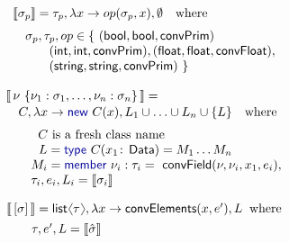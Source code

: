 \documentclass[10pt,preprint,clearpagebib]{sigplanconf}
\newcommand{\langl}{\begin{picture}(4.5,7)
\put(1.1,2.5){\rotatebox{60}{\line(1,0){5.5}}}
\put(1.1,2.5){\rotatebox{300}{\line(1,0){5.5}}}
\end{picture}}
\newcommand{\rangl}{\begin{picture}(4.5,7)
\put(.9,2.5){\rotatebox{120}{\line(1,0){5.5}}}
\put(.9,2.5){\rotatebox{240}{\line(1,0){5.5}}}
\end{picture}}
\newcommand{\kvd}[1]{\textnormal{\textcolor{kvdclr}{\sffamily #1}}}
\newcommand{\ident}[1]{\textnormal{\sffamily #1}}
\newcommand{\sem}[1]{\llbracket #1 \rrbracket}
\begin{document}
\begin{figure}
\begin{multicols}{2}

\noindent
\begin{equation*}
\begin{array}{l} 
 \sem{\sigma_p} = \tau_p,\lambda x\rightarrow op(\sigma_p, x),\emptyset\quad\textnormal{where} \\[0.6em] 
 \quad\sigma_p, \tau_p, op\in  \{~ (\ident{bool}, \ident{bool}, \ident{convPrim})\\
 \hspace{2.9em} (\ident{int}, \ident{int}, \ident{convPrim}), (\ident{float},\ident{float},\ident{convFloat}),\\
 \hspace{2.9em} (\ident{string},\ident{string},\ident{convPrim}) ~\}
\end{array} 
\end{equation*}
\vspace{-2em}

\begin{equation*}
\begin{array}{l}
 \sem{\,\nu~ \{ \nu_1 : \sigma_1, \ldots, \nu_n : \sigma_n \}\,} = \\[0.1em]
 \quad C, \lambda x\rightarrow \kvd{new}~C(x), L_1\cup\ldots\cup L_n\cup\{ L \}\quad\textnormal{where}\\[0.6em]
 \qquad \;\;C~\textnormal{is a fresh class name} \\
 \qquad \;\,\,L = \kvd{type}~C(x_1\!:\!\ident{Data})=M_1 \ldots M_n \\
 \qquad M_i = \kvd{member}~\nu_i:\tau_i=\ident{convField}(\nu, \nu_i, x_1, e_i),\\
 \qquad \tau_i, e_i, L_i = \sem{\sigma_i} 
\end{array}
\end{equation*}
\vspace{-2em}

\begin{equation*}
\begin{array}{l}
 \sem{\,[\sigma]\,} = \ident{list}\langl\tau\rangl, \lambda x \rightarrow \ident{convElements}(x, e'), L \;\;\textnormal{where}\\[0.4em]
 \qquad \tau, e', L = \sem{\hat{\sigma}}
\end{array}
\end{equation*}


\end{multicols}
\end{figure}
\end{document}

